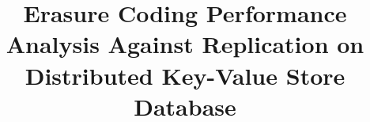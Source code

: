 \documentclass[conference,a4paper,english]{IEEEtran}
\begin{document}
\title{Erasure Coding Performance Analysis Against Replication on Distributed Key-Value Store Database}



\maketitle







\printbibliography
\end{document}
